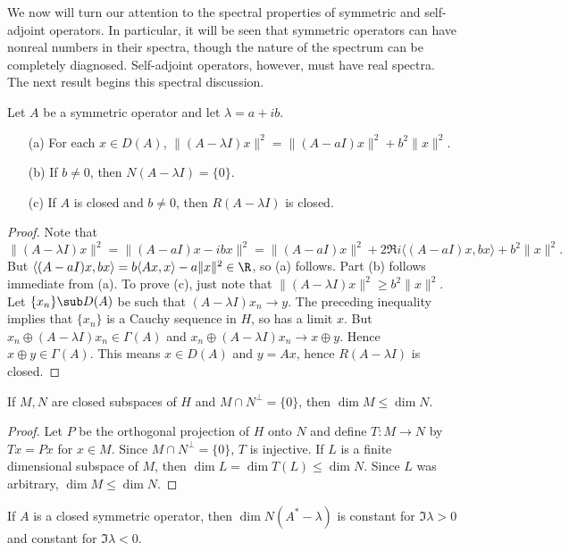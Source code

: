 We now will turn our attention to the spectral properties of symmetric and self-adjoint operators. In particular, it will be seen that symmetric operators can have nonreal numbers in their spectra, though the nature of the spectrum can be completely diagnosed. Self-adjoint operators, however, must have real spectra. The next result begins this spectral discussion.
\begin{proposition}\label{Hilbert space symmetric operator A-lambda I prop}
Let $A$ be a symmetric operator and let $\lambda=a+ib$.
\begin{itemize}
\item[(a)] For each $x\in D(A)$, $\|(A-\lambda I)x\|^2=\|(A-aI)x\|^2+b^2\|x\|^2$.
\item[(b)] If $b\neq 0$, then $N(A-\lambda I)=\{0\}$.
\item[(c)] If $A$ is closed and $b\neq 0$, then $R(A-\lambda I)$ is closed.
\end{itemize}
\end{proposition}
\begin{proof}
Note that
\[\|(A-\lambda I)x\|^2=\|(A-aI)x-ibx\|^2=\|(A-aI)x\|^2+2\Re i\langle(A-aI)x,bx\rangle+b^2\|x\|^2.\]
But $\langle(A-aI)x,bx\rangle=b\langle Ax,x\rangle-a\|x\|^2\in\R$, so (a) follows. Part (b) follows immediate from (a). To prove (c), just note that $\|(A-\lambda I)x\|^2\geq b^2\|x\|^2$. Let $\{x_n\}\sub D(A)$ be such that $(A-\lambda I)x_n\to y$. The preceding inequality implies that $\{x_n\}$ is a Cauchy sequence in $H$, so has a limit $x$. But $x_n\oplus(A-\lambda I)x_n\in\Gamma(A)$ and $x_n\oplus(A-\lambda I)x_n\to x\oplus y$. Hence $x\oplus y\in\Gamma(A)$. This means $x\in D(A)$ and $y=Ax$, hence $R(A-\lambda I)$ is closed.
\end{proof}
\begin{lemma}\label{Hilbert space dim of closed subspace if orthonormal}
If $M,N$ are closed subspaces of $H$ and $M\cap N^\bot=\{0\}$, then $\dim M\leq\dim N$.
\end{lemma}
\begin{proof}
Let $P$ be the orthogonal projection of $H$ onto $N$ and define $T:M\to N$ by $Tx=Px$ for $x\in M$. Since $M\cap N^\bot=\{0\}$, $T$ is injective. If $L$ is a finite dimensional subspace of $M$, then $\dim L=\dim T(L)\leq\dim N$. Since $L$ was arbitrary, $\dim M\leq\dim N$.
\end{proof}
\begin{proposition}\label{Hilbert space closed symmetric operator dim of eigenspace}
If $A$ is a closed symmetric operator, then $\dim N(A^*-\lambda)$ is constant for $\Im\lambda>0$ and constant for $\Im\lambda<0$.
\end{proposition}
